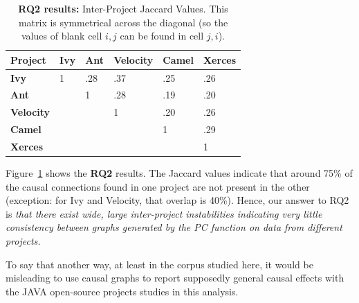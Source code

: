 \documentclass[]{svjour3}
\begin{document}
\begin{table}[!b]
\caption{{\bf RQ2 results:} Inter-Project Jaccard Values. This matrix is symmetrical across the diagonal (so the values of blank cell $i,j$ can be found in
cell $j,i$).}
\label{tab:inter-project}
\begin{center}
\begin{tabular}{|l|l|l|l|l|l|} %
\hline
\footnotesize
\textbf{Project} & \textbf{Ivy} & \textbf{Ant} & \textbf{Velocity} & \textbf{Camel} & \textbf{Xerces}  \\ \hline %
\textbf{Ivy} & 1 & .28 & .37 & .25 & .26 \\ \hline%
\textbf{Ant} &   & 1 & .28 & .19 & .20 \\ \hline%
\textbf{Velocity} &   &  & 1 & .20 & .26 \\ \hline%
\textbf{Camel} &   &   &   & 1 & .29 \\ \hline%
\textbf{Xerces} &   &   &  &   & 1 \\ \hline%

\end{tabular}
\end{center}
\end{table}

Figure~\ref{tab:inter-project} shows the {\bf RQ2} results.
The Jaccard values indicate that around 75\% of the causal connections
found in one project are not present in the other
(exception: for  Ivy and Velocity, that overlap is 40\%). 
Hence, our answer to RQ2 is {\em that there exist wide, large  
 inter-project instabilities indicating very little consistency between graphs generated by the PC function on data from different projects.} 

To say that another way, at least in the corpus studied here, it would
be misleading to use causal graphs to report supposedly general causal effects with the JAVA open-source projects
studies in this analysis.
\end{document}
